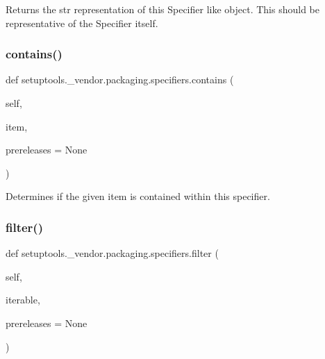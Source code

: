 \begin{DoxyVerb}Returns the str representation of this Specifier like object. This
should be representative of the Specifier itself.
\end{DoxyVerb}
 \mbox{\label{namespacesetuptools_1_1__vendor_1_1packaging_1_1specifiers_a1e89282b60fb60c0e777df80f766fcb5}} 
\subsubsection{\texorpdfstring{contains()}{contains()}}
{\footnotesize\ttfamily def setuptools.\+\_\+vendor.\+packaging.\+specifiers.\+contains (\begin{DoxyParamCaption}\item[{}]{self,  }\item[{}]{item,  }\item[{}]{prereleases = {\ttfamily None} }\end{DoxyParamCaption})}

\begin{DoxyVerb}Determines if the given item is contained within this specifier.
\end{DoxyVerb}
 \mbox{\label{namespacesetuptools_1_1__vendor_1_1packaging_1_1specifiers_a4f34c1386554f2f81a0520e07bf72e74}} 
\subsubsection{\texorpdfstring{filter()}{filter()}}
{\footnotesize\ttfamily def setuptools.\+\_\+vendor.\+packaging.\+specifiers.\+filter (\begin{DoxyParamCaption}\item[{}]{self,  }\item[{}]{iterable,  }\item[{}]{prereleases = {\ttfamily None} }\end{DoxyParamCaption})}

